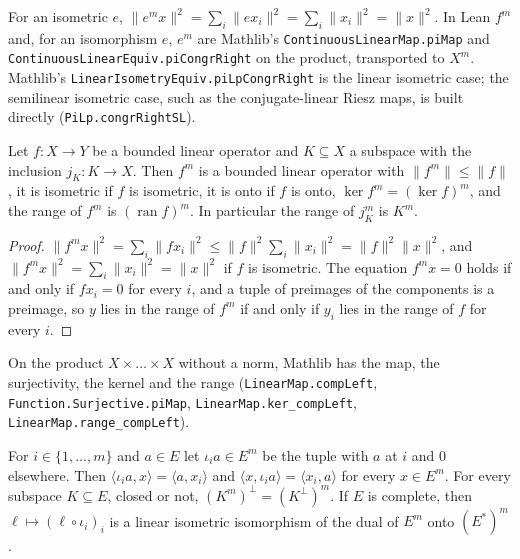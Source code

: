For an isometric $e$, $\|e^m x\|^2 = \sum_i \|e x_i\|^2 = \sum_i \|x_i\|^2 = \|x\|^2$. In Lean
$f^m$ and, for an isomorphism $e$, $e^m$ are Mathlib's
\texttt{ContinuousLinearMap.\allowbreak piMap} and
\texttt{ContinuousLinearEquiv.\allowbreak piCongrRight} on the product, transported to $X^m$.
Mathlib's \texttt{LinearIsometryEquiv.\allowbreak piLpCongrRight} is the linear isometric case;
the semilinear isometric case, such as the conjugate-linear Riesz maps, is built directly
(\texttt{PiLp.\allowbreak congrRightSL}).

\begin{lemma}
\label{lem:pi-lp-map-properties}
\leanok
{}
Let $f \colon X \to Y$ be a bounded linear operator and $K \subseteq X$ a subspace with the
inclusion $j_K \colon K \to X$. Then $f^m$ is a bounded linear operator with
$\|f^m\| \leq \|f\|$, it is isometric if $f$ is isometric, it is onto if $f$ is onto,
$\ker f^m = (\ker f)^m$, and the range of $f^m$ is $(\operatorname{ran} f)^m$. In particular the
range of $j_K^m$ is $K^m$.
\end{lemma}

\begin{proof}
\leanok
$\|f^m x\|^2 = \sum_i \|f x_i\|^2 \leq \|f\|^2 \sum_i \|x_i\|^2 = \|f\|^2 \|x\|^2$, and
$\|f^m x\|^2 = \sum_i \|x_i\|^2 = \|x\|^2$ if $f$ is isometric. The equation $f^m x = 0$ holds if
and only if $f x_i = 0$ for every $i$, and a tuple of preimages of the components is a preimage,
so $y$ lies in the range of $f^m$ if and only if $y_i$ lies in the range of $f$ for every $i$.
\end{proof}

On the product $X \times \dots \times X$ without a norm, Mathlib has the map, the surjectivity,
the kernel and the range (\texttt{LinearMap.\allowbreak compLeft},
\texttt{Function.\allowbreak Surjective.\allowbreak piMap},
\texttt{LinearMap.\allowbreak ker\_\allowbreak compLeft},
\texttt{LinearMap.\allowbreak range\_\allowbreak compLeft}).

\begin{lemma}
\label{lem:pi-lp-orthogonal}
\leanok
{}
For $i \in \{1, \dots, m\}$ and $a \in E$ let $\iota_i a \in E^m$ be the tuple with $a$ at $i$ and
$0$ elsewhere. Then $\langle \iota_i a, x \rangle = \langle a, x_i \rangle$ and
$\langle x, \iota_i a \rangle = \langle x_i, a \rangle$ for every $x \in E^m$. For every subspace
$K \subseteq E$, closed or not, $(K^m)^\perp = (K^\perp)^m$. If $E$ is complete, then
$\ell \mapsto (\ell \circ \iota_i)_i$ is a linear isometric isomorphism of the dual of $E^m$ onto
$(E^*)^m$.
\end{lemma}

